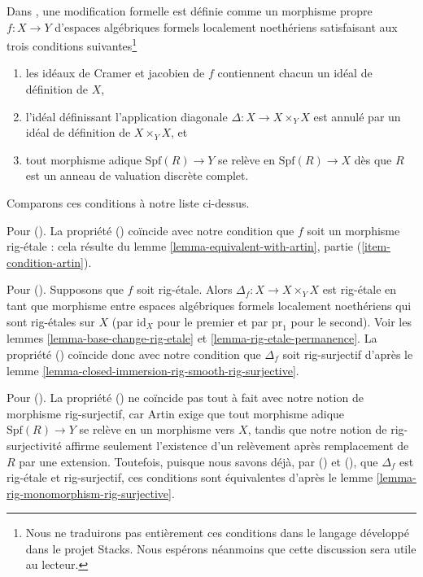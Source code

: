 \begin{remark}
\label{remark-compare-formal-modification-artin}
Dans \cite[Definition 1.7]{ArtinII}, une modification formelle est définie
comme un morphisme propre $f : X \to Y$ d'espaces algébriques formels
localement noethériens satisfaisant aux trois conditions suivantes\footnote{Nous
ne traduirons pas entièrement ces conditions dans le langage développé dans
le projet Stacks. Nous espérons néanmoins que cette discussion sera utile au
lecteur.}
\begin{enumerate}
\item[(\romannumeral1)] les idéaux de Cramer et jacobien de
$f$ contiennent chacun un idéal de définition de $X$,
\item[(\romannumeral2)] l'idéal définissant l'application
diagonale $\Delta : X \to X \times_Y X$
est annulé par un idéal de définition de $X \times_Y X$, et
\item[(\romannumeral3)] tout morphisme adique $\text{Spf}(R) \to Y$
se relève en $\text{Spf}(R) \to X$ dès que $R$ est un
anneau de valuation discrète complet.
\end{enumerate}
Comparons ces conditions à notre liste ci-dessus.

\medskip\noindent
Pour (). La propriété () coïncide avec notre
condition que $f$ soit un morphisme rig-étale : cela résulte du
lemme \ref{lemma-equivalent-with-artin}, partie (\ref{item-condition-artin}).

\medskip\noindent
Pour (). Supposons que $f$ soit rig-étale. Alors
$\Delta_f : X \to X \times_Y X$ est rig-étale en tant que morphisme
entre espaces algébriques formels localement noethériens qui sont
rig-étales sur $X$ (par $\text{id}_X$ pour le premier et par
$\text{pr}_1$ pour le second).
Voir les lemmes \ref{lemma-base-change-rig-etale} et
\ref{lemma-rig-etale-permanence}.
La propriété () coïncide donc avec notre condition
que $\Delta_f$ soit rig-surjectif d'après le
lemme \ref{lemma-closed-immersion-rig-smooth-rig-surjective}.

\medskip\noindent
Pour (). La propriété () ne coïncide pas tout à
fait avec notre notion de morphisme rig-surjectif, car Artin exige que tout
morphisme adique $\text{Spf}(R) \to Y$ se relève en un morphisme vers $X$,
tandis que notre notion de rig-surjectivité affirme seulement l'existence
d'un relèvement après remplacement de $R$ par une extension.
Toutefois, puisque nous savons déjà, par () et
(), que $\Delta_f$ est rig-étale et rig-surjectif,
ces conditions sont équivalentes d'après le
lemme \ref{lemma-rig-monomorphism-rig-surjective}.
\end{remark}

